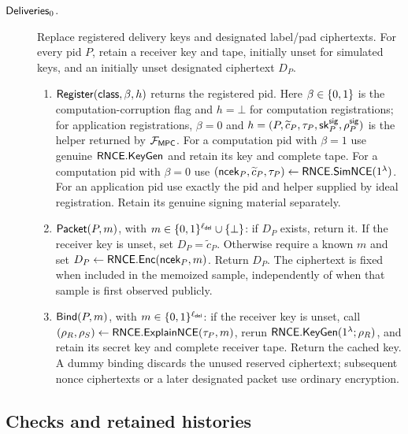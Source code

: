 \begin{description}
\item[$\mathsf{Deliveries}_0$.]\label{hook:deliveries}
 Replace registered delivery keys and designated label/pad ciphertexts.
 For every pid $P$, retain a receiver key and tape, initially unset for
 simulated keys, and an initially unset designated ciphertext $D_P$.
 \begin{enumerate}
 \item $\mathsf{Register}(\mathsf{class},\beta,h)$ returns the registered pid.
   Here $\beta\in\{0,1\}$ is the computation-corruption flag and $h=\bot$
   for computation registrations; for application registrations,
   $\beta=0$ and
   $h=(P,\widetilde c_P,\tau_P,\mathsf{sk}^{\mathsf{sig}}_P,\rho^{\mathsf{sig}}_P)$ is the
   helper returned by $\mathcal F_{\mathsf{MPC}}$.  For a computation pid with $\beta=1$ use
   genuine $\mathsf{RNCE}.\mathsf{KeyGen}$ and retain its key and complete tape.
   For a computation pid with $\beta=0$ use
   $(\mathsf{ncek}_P,\widetilde c_P,\tau_P)\mathrel{\leftarrow}\mathsf{RNCE}.\mathsf{SimNCE}(1^\lambda)$.
   For an application pid use exactly the pid and helper supplied by
   ideal registration.  Retain its genuine signing material separately.
 \item $\mathsf{Packet}(P,m)$, with $m\in\{0,1\}^{\ell_{\mathsf{del}}}\cup\{\bot\}$:
   if $D_P$ exists, return it.  If the receiver key is unset, set
   $D_P=\widetilde c_P$.  Otherwise require a known $m$ and set
   $D_P\mathrel{\leftarrow}\mathsf{RNCE}.\mathsf{Enc}(\mathsf{ncek}_P,m)$.  Return $D_P$.
   The ciphertext is fixed when included in the memoized sample,
   independently of when that sample is first observed publicly.
 \item $\mathsf{Bind}(P,m)$, with $m\in\{0,1\}^{\ell_{\mathsf{del}}}$:
   if the receiver key is unset, call
   $(\rho_R,\rho_S)\mathrel{\leftarrow}\mathsf{RNCE}.\mathsf{ExplainNCE}(\tau_P,m)$,
   rerun $\mathsf{RNCE}.\mathsf{KeyGen}(1^\lambda;\rho_R)$, and retain its secret key
   and complete receiver tape.  Return the cached key.
   A dummy binding discards the unused reserved ciphertext; subsequent
   nonce ciphertexts or a later designated packet use ordinary encryption.
 \end{enumerate}
\end{description}

\subsection{Checks and retained histories}
\label{sec:simulator-checks}

